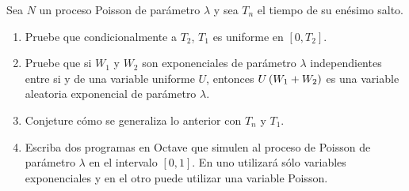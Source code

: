 ﻿\begin{problema}
	Sea $N$ un proceso Poisson de par\'ametro $\lambda$ y sea $T_n$ el tiempo de su en\'esimo salto. 
	
	\begin{enumerate}
		\item 
			Pruebe que condicionalmente a $T_2$, $T_1$ es uniforme en $[0,T_2]$. 
			
		\item 
			Pruebe que si $W_1$ y $W_2$  son  exponenciales de par\'ametro 
			$\lambda$  independientes entre si y de una variable uniforme $U$, 
			entonces $U\left( W_1+W_2\right) $ es una variable aleatoria exponencial 
			de par\'ametro $\lambda$. 

		\item 
			Conjeture c\'omo se  generaliza lo anterior con $T_n$ y $T_1$.

		\item 
			Escriba dos programas en Octave que simulen al proceso de Poisson 
			de par\'ametro $\lambda$ en el intervalo $[0,1]$. En uno utilizar\'a 
			s\'olo variables exponenciales y en el otro puede utilizar una 
			variable Poisson.
	\end{enumerate}
\end{problema}

